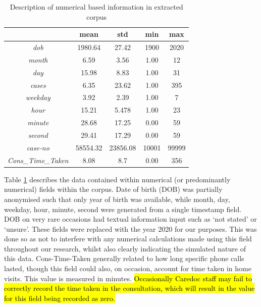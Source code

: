  \begin{table}[htbp]
 \setlength{\tabcolsep}{8pt}
 \caption{Description of numerical based information in extracted corpus}
\centering
  \label{table:numerical-data}
\begin{tabular}{@{}c|cccc@{}}
\toprule
\multicolumn{1}{l|}{}      & \textbf{mean} & \textbf{std} & \textbf{min} & \textbf{max} \\ \midrule
\textit{dob}               & 1980.64       & 27.42        & 1900         & 2020         \\
\textit{month}             & 6.59          & 3.56         & 1.00         & 12           \\
\textit{day}               & 15.98         & 8.83         & 1.00         & 31           \\
\textit{cases}             & 6.35          & 23.62        & 1.00         & 395          \\
\textit{weekday}           & 3.92          & 2.39         & 1.00         & 7            \\
\textit{hour}              & 15.21         & 5.478        & 1.00         & 23           \\
\textit{minute}            & 28.68         & 17.25        & 0.00         & 59           \\
\textit{second}            & 29.41         & 17.29        & 0.00         & 59           \\
\textit{case-no}           & 58554.32      & 23856.08     & 10001        & 99999        \\
\textit{Cons\_Time\_Taken} & 8.08          & 8.7          & 0.00         & 356          \\ \bottomrule
\end{tabular}
\end{table}

Table \ref{table:numerical-data} describes the data contained within numerical (or predominantly numerical) fields within the corpus. Date of birth (DOB) was partially anonymised such that only year of birth was available, while month, day, weekday, hour, minute, second were generated from a single timestamp field. DOB on very rare occasions had textual information input such as `not stated' or `unsure'. These fields were replaced with the year 2020 for our purposes. This was done so as not to interfere with any numerical calculations made using this field throughout our research, whilst also clearly indicating the simulated nature of this data. Cons-Time-Taken generally related to how long specific phone calls lasted, though this field could also, on occasion, account for time taken in home visits. This value is measured in minutes. \hl{Occasionally Caredoc staff may fail to correctly record the time taken in the consultation, which will result in the value for this field being recorded as zero.}  
 
